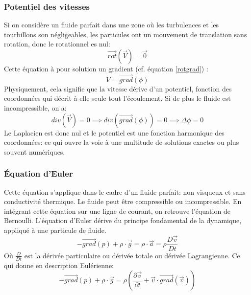\documentclass[10pt,a4paper]{article}
\begin{document}
\subsubsection{Potentiel des vitesses}
Si on considère un fluide parfait dans une zone où les turbulences et les tourbillons son négligeables, les particules ont un mouvement de translation sans rotation, donc le rotationnel es nul:
\[ \overrightarrow{rot}(\overrightarrow{V}) = \overrightarrow{0}\]
Cette équation à pour solution un gradient (cf. équation \ref{rotgrad}) :
\[ V = \overrightarrow{grad}(\phi) \]
Physiquement, cela signifie que la vitesse dérive d'un potentiel, fonction des coordonnées qui décrit à elle seule tout l'écoulement. Si de plus le fluide est incompressible, on a:
\[ div(\overrightarrow{V}) = 0 \implies div(\overrightarrow{grad}(\phi)) = 0 \implies \Delta \phi = 0 \]
Le Laplacien est donc nul et le potentiel est une fonction harmonique des coordonnées: ce qui ouvre la voie à une multitude de solutions exactes ou plus souvent numériques.

\subsubsection{Équation d'Euler\cite{eqeuler}}
Cette équation s'applique dans le cadre d'un fluide parfait: non visqueux et sans conductivité thermique. Le fluide peut être compressible ou incompressible. En intégrant cette équation sur une ligne de courant, on retrouve l'équation de Bernoulli. L'équation d'Euler dérive du principe fondamental de la dynamique, appliqué à une particule de fluide.
\begin{equation}
-\overrightarrow{grad}(p) + \rho\cdot\overrightarrow{g} = \rho\cdot\overrightarrow{a} = \rho\frac{D\overrightarrow{v}}{Dt}
\end{equation}
Où $\frac{D }{Dt}$ est la dérivée particulaire ou dérivée totale ou dérivée Lagrangienne. Ce qui donne en description Eulérienne:
\begin{equation}
-\overrightarrow{grad}(p) + \rho\cdot\overrightarrow{g} =  \rho(\frac{\partial \overrightarrow{v}}{\partial t} + \overrightarrow{v}\cdot\overrightarrow{grad}(\overrightarrow{v}))
\end{equation}

\end{document}
